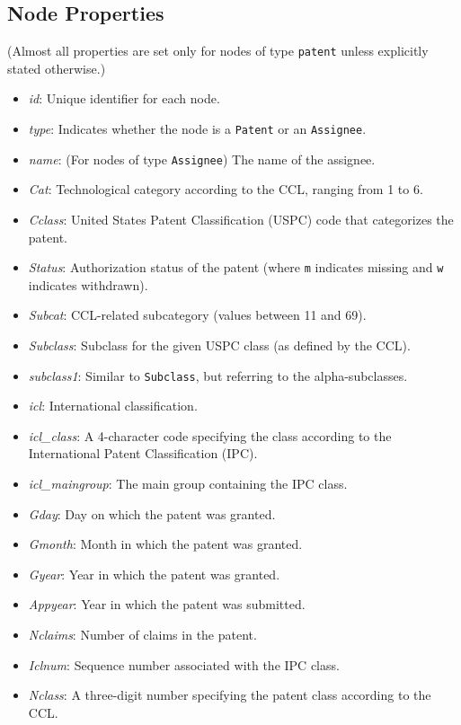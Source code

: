 \subsection*{Node Properties}
(Almost all properties are set only for nodes of type \texttt{patent} unless explicitly stated otherwise.)
\begin{itemize}
    \item \emph{id}: Unique identifier for each node.
    \item \emph{type}: Indicates whether the node is a \texttt{Patent} or an \texttt{Assignee}.
    \item \emph{name}: (For nodes of type \texttt{Assignee}) The name of the assignee.
    \item \emph{Cat}: Technological category according to the CCL, ranging from 1 to 6.
    \item \emph{Cclass}: United States Patent Classification (USPC) code that categorizes the patent.
    \item \emph{Status}: Authorization status of the patent (where \texttt{m} indicates missing and \texttt{w} indicates withdrawn).
    \item \emph{Subcat}: CCL-related subcategory (values between 11 and 69).
    \item \emph{Subclass}: Subclass for the given USPC class (as defined by the CCL).
    \item \emph{subclass1}: Similar to \texttt{Subclass}, but referring to the alpha-subclasses.
    \item \emph{icl}: International classification.
    \item \emph{icl\_class}: A 4-character code specifying the class according to the International Patent Classification (IPC).
    \item \emph{icl\_maingroup}: The main group containing the IPC class.
    \item \emph{Gday}: Day on which the patent was granted.
    \item \emph{Gmonth}: Month in which the patent was granted.
    \item \emph{Gyear}: Year in which the patent was granted.
    \item \emph{Appyear}: Year in which the patent was submitted.
    \item \emph{Nclaims}: Number of claims in the patent.
    \item \emph{Iclnum}: Sequence number associated with the IPC class.
    \item \emph{Nclass}: A three-digit number specifying the patent class according to the CCL.

\end{itemize}
